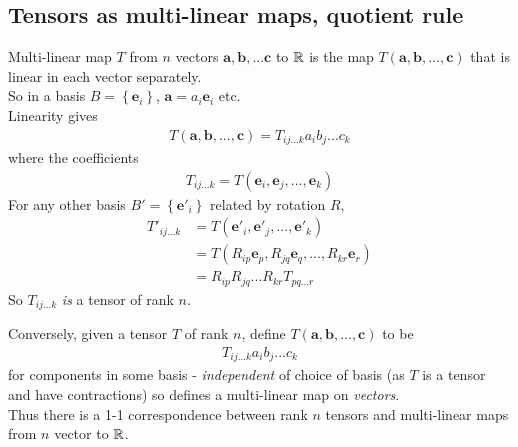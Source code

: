 \documentclass[a4paper]{article}
\begin{document}
\subsection{Tensors as multi-linear maps, quotient rule}
Multi-linear map $T$ from $n$ vectors $\mathbf{a},\mathbf{b},...\mathbf{c}$ to $\mathbb{R}$ is the map $T\left(\mathbf{a},\mathbf{b},...,\mathbf{c}\right)$ that is linear in each vector separately.\\
So in a basis $B=\left\{\mathbf{e}_i\right\}$, $\mathbf{a} = a_i \mathbf{e}_i$ etc.\\
Linearity gives
\begin{equation*}
\begin{aligned}
T\left(\mathbf{a}, \mathbf{b},...,\mathbf{c}\right) = T_{ij...k} a_i b_j ... c_k
\end{aligned}
\end{equation*}
where the coefficients
\begin{equation*}
\begin{aligned}
T_{ij...k}  = T\left(\mathbf{e}_i, \mathbf{e}_j,...,\mathbf{e}_k\right)
\end{aligned}
\end{equation*}
For any other basis $B'=\left\{\mathbf{e}'_i\right\}$ related by rotation $R$,
\begin{equation*}
\begin{aligned}
T'_{ij...k} &= T\left(\mathbf{e}'_i, \mathbf{e}'_j, ..., \mathbf{e}'_k\right)\\
&= T\left(R_{ip} \mathbf{e}_p, R_{jq} \mathbf{e}_q, ..., R_{kr} \mathbf{e}_r\right)\\
&= R_{ip} R_{jq} ... R_{kr} T_{pq...r}
\end{aligned}
\end{equation*}
So $T_{ij...k}$ \emph{is} a tensor of rank $n$.

Conversely, given a tensor $T$ of rank $n$, define $T\left(\mathbf{a},\mathbf{b},...,\mathbf{c}\right)$ to be
\begin{equation*}
\begin{aligned}
T_{ij...k} a_i b_j ... c_k
\end{aligned}
\end{equation*}
for components in some basis - \emph{independent} of choice of basis (as $T$ is a tensor and have contractions) so defines a multi-linear map on \emph{vectors}.\\
Thus there is a 1-1 correspondence between rank $n$ tensors and multi-linear maps from $n$ vector to $\mathbb{R}$.
\end{document}
